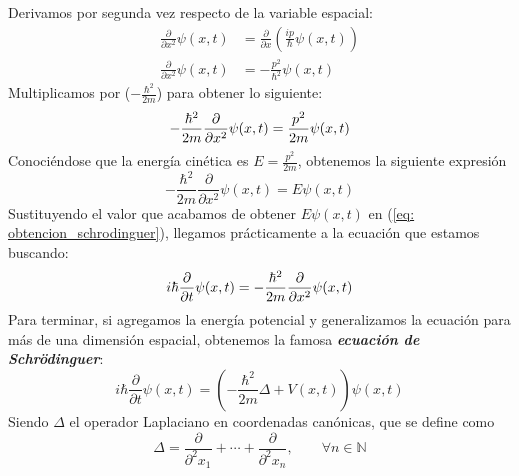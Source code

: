 \documentclass{article}
\numberwithin{equation}{section} %
\begin{document}
    Derivamos por segunda vez respecto de la variable espacial:
    \begin{align*}
        \frac{\partial}{\partial x^{2}} \psi(x, t) &= \frac{\partial}{\partial x} \left( \frac{ip}{\hbar} \psi(x, t) \right) \\[10pt]
        \frac{\partial}{\partial x^{2}} \psi(x, t) &= - \frac{p^{2}}{\hbar^{2}} \psi(x, t)
    \end{align*}
    Multiplicamos por (\( - \frac{\hbar^{2}}{2m} \)) para obtener lo siguiente:
    \begin{equation*}
        - \frac{\hbar^{2}}{2m} \frac{\partial}{\partial x^{2}} \psi(x, t) = \frac{p^{2}}{2m} \psi(x, t)
        \\[2mm]
    \end{equation*}
    Conociéndose que la energía cinética es \( E = \frac{p^{2}}{2m} \), obtenemos la siguiente expresión
    \begin{equation*}
        - \frac{\hbar^{2}}{2m} \frac{\partial}{\partial x^{2}} \psi(x, t) = E \psi(x, t)
    \end{equation*}
    Sustituyendo el valor que acabamos de obtener \( E \psi(x, t) \) en (\ref{eq: obtencion_schrodinguer}), llegamos prácticamente a la ecuación que estamos buscando:
    \begin{equation*}
        i \hbar \frac{\partial}{\partial t} \psi(x, t) = - \frac{\hbar^{2}}{2m} \frac{\partial}{\partial x^{2}} \psi(x, t)
        \\[2mm]
    \end{equation*}
    Para terminar, si agregamos la energía potencial y generalizamos la ecuación para más de una dimensión espacial, obtenemos la famosa \textbf{\textit{ecuación de Schrödinguer}}:
    \begin{equation}
        \boxed{i \hbar \frac{\partial}{\partial t} \psi(x, t) = (- \frac{\hbar^{2}}{2m} \Delta + V(x, t)) \psi(x, t)} 
        \label{eq: ecuacion_schrodinguer}     
    \end{equation}
    Siendo \( \Delta \) el operador Laplaciano en coordenadas canónicas, que se define como
    \begin{equation*}
        \Delta = \frac{\partial}{\partial^{2} x_{1}} + \cdots + \frac{\partial}{\partial^{2} x_{n}}, \qquad \forall n \in \mathbb{N}
    \end{equation*}

    \vspace{5mm}
\end{document}
